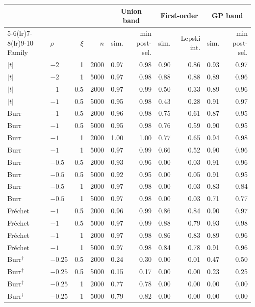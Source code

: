 \begin{tabular}{llrrrrrrrr}
\toprule
 & & & & \multicolumn{2}{c}{Union band} & \multicolumn{2}{c}{First-order} & \multicolumn{2}{c}{GP band}\\
\cmidrule(lr){5-6}\cmidrule(lr){7-8}\cmidrule(lr){9-10}
Family & $\rho$ & $\xi$ & $n$ & sim. & min post-sel. & sim. & Lepski int. & sim. & min post-sel.\\
\midrule
$|t|$ & $-2$ & 1 & 2000 & 0.97 & 0.98 & 0.90 & 0.86 & 0.93 & 0.97\\
$|t|$ & $-2$ & 1 & 5000 & 0.97 & 0.98 & 0.88 & 0.88 & 0.89 & 0.96\\
$|t|$ & $-1$ & 0.5 & 2000 & 0.97 & 0.99 & 0.50 & 0.33 & 0.89 & 0.96\\
$|t|$ & $-1$ & 0.5 & 5000 & 0.95 & 0.98 & 0.43 & 0.28 & 0.91 & 0.97\\
Burr & $-1$ & 0.5 & 2000 & 0.96 & 0.98 & 0.75 & 0.61 & 0.87 & 0.95\\
Burr & $-1$ & 0.5 & 5000 & 0.95 & 0.98 & 0.76 & 0.59 & 0.90 & 0.95\\
Burr & $-1$ & 1 & 2000 & 1.00 & 1.00 & 0.77 & 0.65 & 0.94 & 0.98\\
Burr & $-1$ & 1 & 5000 & 0.97 & 0.99 & 0.66 & 0.52 & 0.90 & 0.96\\
Burr & $-0.5$ & 0.5 & 2000 & 0.93 & 0.96 & 0.00 & 0.03 & 0.91 & 0.96\\
Burr & $-0.5$ & 0.5 & 5000 & 0.92 & 0.95 & 0.00 & 0.05 & 0.91 & 0.95\\
Burr & $-0.5$ & 1 & 2000 & 0.97 & 0.98 & 0.00 & 0.03 & 0.83 & 0.84\\
Burr & $-0.5$ & 1 & 5000 & 0.97 & 0.98 & 0.00 & 0.03 & 0.71 & 0.77\\
Fr\'echet & $-1$ & 0.5 & 2000 & 0.96 & 0.99 & 0.86 & 0.84 & 0.90 & 0.97\\
Fr\'echet & $-1$ & 0.5 & 5000 & 0.97 & 0.99 & 0.88 & 0.79 & 0.93 & 0.98\\
Fr\'echet & $-1$ & 1 & 2000 & 0.97 & 0.98 & 0.86 & 0.83 & 0.89 & 0.96\\
Fr\'echet & $-1$ & 1 & 5000 & 0.97 & 0.98 & 0.84 & 0.78 & 0.91 & 0.96\\
Burr$^{\dagger}$ & $-0.25$ & 0.5 & 2000 & 0.24 & 0.30 & 0.00 & 0.01 & 0.47 & 0.50\\
Burr$^{\dagger}$ & $-0.25$ & 0.5 & 5000 & 0.15 & 0.17 & 0.00 & 0.00 & 0.23 & 0.25\\
Burr$^{\dagger}$ & $-0.25$ & 1 & 2000 & 0.77 & 0.78 & 0.00 & 0.00 & 0.00 & 0.00\\
Burr$^{\dagger}$ & $-0.25$ & 1 & 5000 & 0.79 & 0.82 & 0.00 & 0.00 & 0.00 & 0.00\\
\bottomrule
\end{tabular}
